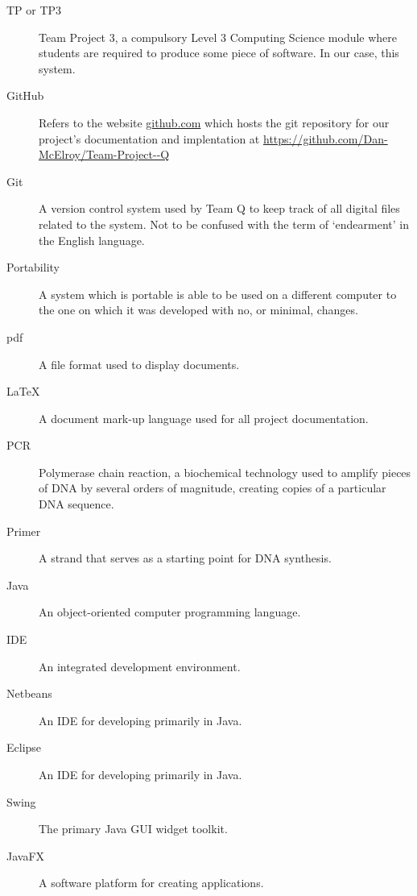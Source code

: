 \begin{description}

\item[TP or TP3] {Team Project 3, a compulsory Level 3 Computing
    Science module where students are required to produce some piece
    of software. In our case, this system.}

\item[GitHub] {Refers to the website \url{github.com} which
    hosts the git repository for our project's documentation and
    implentation at \url{https://github.com/Dan-McElroy/Team-Project--Q}}

\item[Git] {A version control system used by Team Q to keep
    track of all digital files related to the system. Not to be
    confused with the term of `endearment' in the English language.}

\item[Portability] {A system which is portable is able to be used on a
    different computer to the one on which it was developed with no,
    or minimal, changes.}

\item[pdf] {A file format used to display documents.}

\item[LaTeX] {A document mark-up language used for all project documentation.}

\item[PCR] {Polymerase chain reaction, a biochemical technology used to amplify pieces of DNA by several orders of magnitude, creating copies of a particular DNA sequence.}

\item[Primer] {A strand that serves as a starting point for DNA synthesis.}

\item[Java] {An object-oriented computer programming language.}

\item[IDE] {An integrated development environment.}

\item[Netbeans] {An IDE for developing primarily in Java.}

\item[Eclipse] {An IDE for developing primarily in Java.}

\item[Swing] {The primary Java GUI widget toolkit.}

\item[JavaFX] {A software platform for creating applications.}


\end{description}
